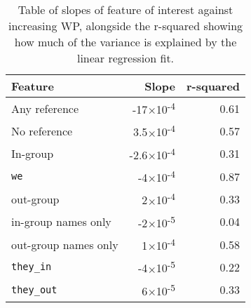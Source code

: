 \begin{table}[t]
    \centering
    \begin{tabular}{lrr}
        \toprule
        \textbf{Feature} & \textbf{Slope} & \textbf{r-squared} \\ \midrule
        Any reference & -17$\times$10\textsuperscript{-4} & 0.61 \\ 
        No reference & 3.5$\times$10\textsuperscript{-4} & 0.57 \\
        In-group & -2.6$\times$10\textsuperscript{-4} & 0.31 \\ 
        \texttt{we} & -4$\times$10\textsuperscript{-4} & 0.87 \\  
        out-group & 2$\times$10\textsuperscript{-4} & 0.33 \\
        in-group names only & -2$\times$10\textsuperscript{-5} & 0.04 \\
        out-group names only & 1$\times$10\textsuperscript{-4} & 0.58 \\
        \texttt{they\_in} & -4$\times$10\textsuperscript{-5} & 0.22 \\
        \texttt{they\_out} & 6$\times$10\textsuperscript{-5} & 0.33 \\ \bottomrule
    \end{tabular}
    \caption{Table of slopes of feature of interest against increasing WP, alongside the r-squared showing how much of the variance is explained by the linear regression fit.}
    \label{tab:slopes}
\end{table}
